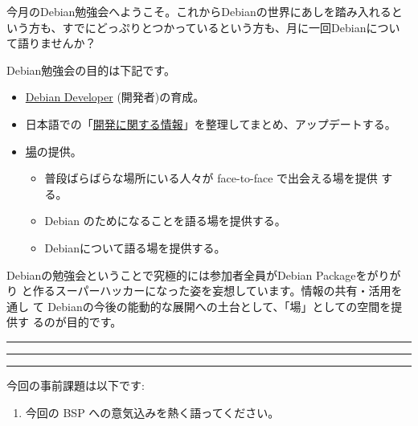 \documentclass[mingoth,a4paper]{jsarticle}
\begin{document}
\begin{multicols}{2}
 
 
 今月のDebian勉強会へようこそ。これからDebianの世界にあしを踏み入れると
 いう方も、すでにどっぷりとつかっているという方も、月に一回Debianについ
 て語りませんか？

 Debian勉強会の目的は下記です。

 \begin{itemize}
 \item \underline{Debian Developer} (開発者)の育成。
 \item 日本語での「\underline{開発に関する情報}」を整理してまとめ、アップデートする。
 \item \underline{場}の提供。
 \begin{itemize}
  \item 普段ばらばらな場所にいる人々が face-to-face で出会える場を提供
	する。
  \item Debian のためになることを語る場を提供する。
  \item Debianについて語る場を提供する。
 \end{itemize}
 \end{itemize}		

 Debianの勉強会ということで究極的には参加者全員がDebian Packageをがりがり
 と作るスーパーハッカーになった姿を妄想しています。情報の共有・活用を通し
 て Debianの今後の能動的な展開への土台として、「場」としての空間を提供す
 るのが目的です。

\end{multicols}

\newpage

\begin{minipage}[b]{0.2\hsize}
 \colorbox{titleback}{}
\end{minipage}
\begin{minipage}[b]{0.8\hsize}
\hrule
\vspace{2mm}
\hrule
\tableofcontents
\vspace{2mm}
\hrule
\end{minipage}


今回の事前課題は以下です:

\begin{enumerate}
 \item 今回の BSP への意気込みを熱く語ってください。
\end{enumerate}
\end{document}
